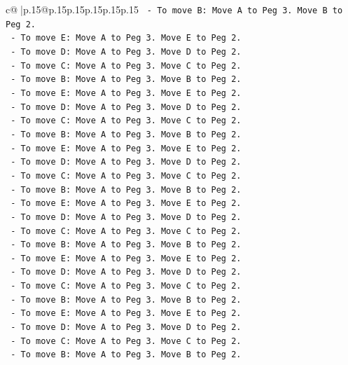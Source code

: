\documentclass{article}
\begin{document}
{\begin{supertabular}{c@{$\;$}|p{.15\linewidth}@{}p{.15\linewidth}p{.15\linewidth}p{.15\linewidth}p{.15\linewidth}p{.15\linewidth}}
{{{\texttt{    {-}   To move B: Move A to Peg 3. Move B to Peg 2.} \\
\texttt{    {-}   To move E: Move A to Peg 3. Move E to Peg 2.} \\
\texttt{    {-}   To move D: Move A to Peg 3. Move D to Peg 2.} \\
\texttt{    {-}   To move C: Move A to Peg 3. Move C to Peg 2.} \\
\texttt{    {-}   To move B: Move A to Peg 3. Move B to Peg 2.} \\
\texttt{    {-}   To move E: Move A to Peg 3. Move E to Peg 2.} \\
\texttt{    {-}   To move D: Move A to Peg 3. Move D to Peg 2.} \\
\texttt{    {-}   To move C: Move A to Peg 3. Move C to Peg 2.} \\
\texttt{    {-}   To move B: Move A to Peg 3. Move B to Peg 2.} \\
\texttt{    {-}   To move E: Move A to Peg 3. Move E to Peg 2.} \\
\texttt{    {-}   To move D: Move A to Peg 3. Move D to Peg 2.} \\
\texttt{    {-}   To move C: Move A to Peg 3. Move C to Peg 2.} \\
\texttt{    {-}   To move B: Move A to Peg 3. Move B to Peg 2.} \\
\texttt{    {-}   To move E: Move A to Peg 3. Move E to Peg 2.} \\
\texttt{    {-}   To move D: Move A to Peg 3. Move D to Peg 2.} \\
\texttt{    {-}   To move C: Move A to Peg 3. Move C to Peg 2.} \\
\texttt{    {-}   To move B: Move A to Peg 3. Move B to Peg 2.} \\
\texttt{    {-}   To move E: Move A to Peg 3. Move E to Peg 2.} \\
\texttt{    {-}   To move D: Move A to Peg 3. Move D to Peg 2.} \\
\texttt{    {-}   To move C: Move A to Peg 3. Move C to Peg 2.} \\
\texttt{    {-}   To move B: Move A to Peg 3. Move B to Peg 2.} \\
\texttt{    {-}   To move E: Move A to Peg 3. Move E to Peg 2.} \\
\texttt{    {-}   To move D: Move A to Peg 3. Move D to Peg 2.} \\
\texttt{    {-}   To move C: Move A to Peg 3. Move C to Peg 2.} \\
\texttt{    {-}   To move B: Move A to Peg 3. Move B to Peg 2.} \\
}}}
\end{supertabular}}
\end{document}
